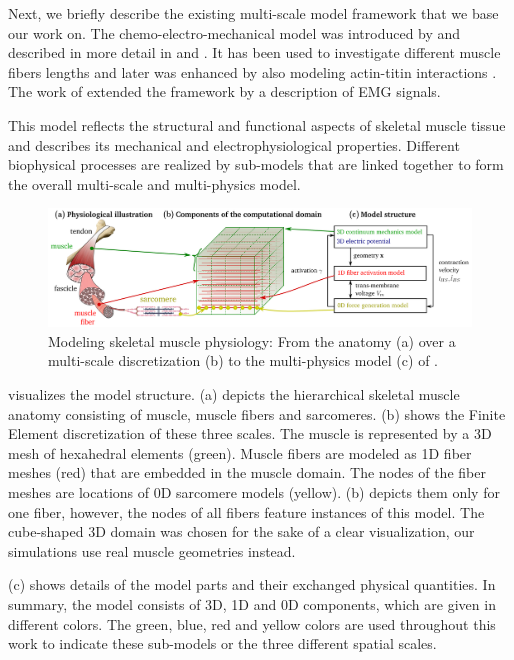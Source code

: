 Next, we briefly describe the existing multi-scale model framework that we base our work on.
The chemo-electro-mechanical model was introduced by \cite{Roehrle2012} and described in more detail in \cite{Heidlauf2013} and \cite{Heidlauf2015Diss}. It has been used to investigate different muscle fibers lengths \cite{Heidlauf2014} and later was enhanced by also modeling actin-titin interactions \cite{Heidlauf2016}. The work of \cite{Mordhorst2015} extended the framework by a description of EMG signals.

This model reflects the structural and functional aspects of skeletal muscle tissue and describes its mechanical and electrophysiological properties. Different biophysical processes are realized by sub-models that are linked together to form the overall multi-scale and multi-physics model.

\begin{figure}
  \centering%
  \includegraphics[width=\textwidth]{images/introduction/model_scheme_overview.pdf}%
  \caption{Modeling skeletal muscle physiology: From the anatomy (a) over a multi-scale discretization (b) to the multi-physics model (c) of \cite{Roehrle2012}.}%
  \label{fig:model_scheme_overview_full}%
\end{figure}%

 visualizes the model structure.  (a) depicts the hierarchical skeletal muscle anatomy consisting of muscle, muscle fibers and sarcomeres.  (b) shows the Finite Element discretization of these three scales. The muscle is represented by a 3D mesh of hexahedral elements (green). Muscle fibers are modeled as 1D fiber meshes (red) that are embedded in the muscle domain. The nodes of the fiber meshes are locations of 0D sarcomere models (yellow).  (b) depicts them only for one fiber, however, the nodes of all fibers feature instances of this model. The cube-shaped 3D domain was chosen for the sake of a clear visualization, our simulations use real muscle geometries instead.

 (c) shows details of the model parts and their exchanged physical quantities. In summary, the model consists of 3D, 1D and 0D components, which are given in different colors.
The green, blue, red and yellow colors are used throughout this work to indicate these sub-models or the three different spatial scales.


